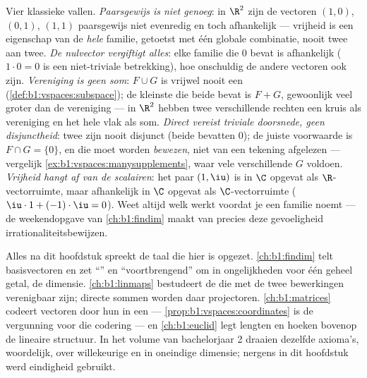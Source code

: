 \begin{remark}
\label{rem:b1:vspaces:pitfalls}
Vier klassieke vallen.
\emph{Paarsgewijs is niet genoeg}: in $\R^2$ zijn de vectoren
$(1,0)$, $(0,1)$, $(1,1)$ paarsgewijs niet evenredig en toch
afhankelijk --- vrijheid is een eigenschap van de \emph{hele}
familie, getoetst met één globale combinatie, nooit twee aan twee.
\emph{De nulvector vergiftigt alles}: elke familie die $0$ bevat
is afhankelijk ($1\cdot 0 = 0$ is een niet-triviale betrekking),
hoe onschuldig de andere vectoren ook zijn.
\emph{Vereniging is geen som}: $F \cup G$ is vrijwel nooit een
 (\cref{def:b1:vspaces:subspace}); de kleinste 
die beide bevat is $F + G$, gewoonlijk veel groter dan de
vereniging --- in $\R^2$ hebben twee verschillende rechten een
kruis als vereniging en het hele vlak als som.
\emph{Direct vereist triviale doorsnede, geen disjunctheid}: twee
 zijn nooit disjunct (beide bevatten $0$); de juiste
voorwaarde is $F \cap G = \{0\}$, en die moet worden
\emph{bewezen}, niet van een tekening afgelezen --- vergelijk
\cref{ex:b1:vspaces:manysupplements}, waar vele verschillende $G$
voldoen.
\emph{Vrijheid hangt af van de scalairen}: het paar $(1, \iu)$ is
 in $\C$ opgevat als $\R$-vectorruimte, maar afhankelijk in
$\C$ opgevat als $\C$-vectorruimte ($\iu\cdot 1 + (-1)\cdot\iu =
0$). Weet altijd welk  werkt voordat je een familie 
noemt --- de weekendopgave van \cref{ch:b1:findim} maakt van
precies deze gevoeligheid irrationaliteitsbewijzen.
\end{remark}

\begin{remark}
\label{rem:b1:vspaces:whereused}
Alles na dit hoofdstuk spreekt de taal die hier is opgezet.
\cref{ch:b1:findim} telt basisvectoren en zet ``'' en
``voortbrengend'' om in ongelijkheden voor één geheel getal, de
dimensie. \cref{ch:b1:linmaps} bestudeert de  die met
de twee bewerkingen verenigbaar zijn; directe sommen worden daar
projectoren. \cref{ch:b1:matrices} codeert vectoren door hun
 in een  --- \cref{prop:b1:vspaces:coordinates} is
de vergunning voor die codering --- en \cref{ch:b1:euclid} legt
lengten en hoeken bovenop de lineaire structuur. In het volume van
bachelorjaar 2 draaien dezelfde axioma's, woordelijk, over
willekeurige  en in oneindige dimensie; nergens in dit
hoofdstuk werd eindigheid gebruikt.
\end{remark}

